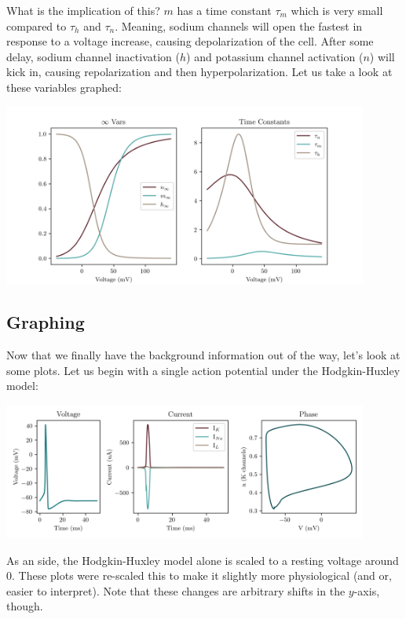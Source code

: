 What is the implication of this? $m$ has a time constant $\tau_m$ which is very small compared to $\tau_h$ and $\tau_n$. Meaning, sodium channels will open the fastest in response to a voltage increase, causing depolarization of the cell. After some delay, sodium channel inactivation ($h$) and potassium channel activation ($n$) will kick in, causing repolarization and then hyperpolarization. Let us take a look at these variables graphed: 

\begin{center}
\includegraphics[width=0.9\textwidth]{images/models/hhconsts.png}
\end{center}

\subsection{Graphing}

Now that we finally have the background information out of the way, let's look at some plots. Let us begin with a single action potential under the Hodgkin-Huxley model: 

\begin{center}
\includegraphics[width=0.9\textwidth]{images/models/hh1.png}
\end{center}

As an side, the Hodgkin-Huxley model alone is scaled to a resting voltage around 0. These plots were re-scaled this to make it slightly more physiological (and or, easier to interpret). Note that these changes are arbitrary shifts in the $y$-axis, though.\newline

